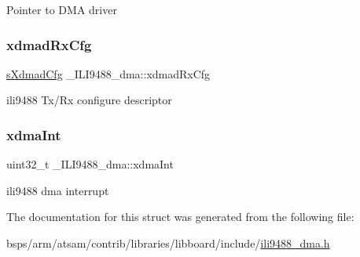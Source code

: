 Pointer to D\+MA driver \mbox{\label{struct__ILI9488__dma_a4a717f1ae1ecbca415e952f545ce34a8}} 
\subsubsection{\texorpdfstring{xdmadRxCfg}{xdmadRxCfg}}
{\footnotesize\ttfamily \mbox{\hyperlink{struct__XdmadCfg}{s\+Xdmad\+Cfg}} \+\_\+\+I\+L\+I9488\+\_\+dma\+::xdmad\+Rx\+Cfg}

ili9488 Tx/\+Rx configure descriptor \mbox{\label{struct__ILI9488__dma_a868976292a3596bb1d1aba38bec02637}} 
\subsubsection{\texorpdfstring{xdmaInt}{xdmaInt}}
{\footnotesize\ttfamily uint32\+\_\+t \+\_\+\+I\+L\+I9488\+\_\+dma\+::xdma\+Int}

ili9488 dma interrupt 

The documentation for this struct was generated from the following file\+:\begin{DoxyCompactItemize}
\item 
bsps/arm/atsam/contrib/libraries/libboard/include/\mbox{\hyperlink{ili9488__dma_8h}{ili9488\+\_\+dma.\+h}}\end{DoxyCompactItemize}

